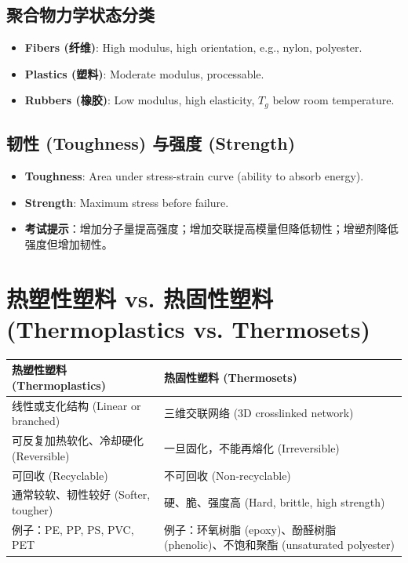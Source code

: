 \documentclass[12pt,a4paper]{ctexart}
\begin{document}
\subsection{聚合物力学状态分类}
\begin{itemize}
    \item \textbf{Fibers (纤维)}: High modulus, high orientation, e.g., nylon, polyester.
    \item \textbf{Plastics (塑料)}: Moderate modulus, processable.
    \item \textbf{Rubbers (橡胶)}: Low modulus, high elasticity, $T_g$ below room temperature.
\end{itemize}

\subsection{韧性 (Toughness) 与强度 (Strength)}
\begin{itemize}
    \item \textbf{Toughness}: Area under stress-strain curve (ability to absorb energy).
    \item \textbf{Strength}: Maximum stress before failure.
    \item \textbf{考试提示}：增加分子量提高强度；增加交联提高模量但降低韧性；增塑剂降低强度但增加韧性。
\end{itemize}

\section{热塑性塑料 vs. 热固性塑料 (Thermoplastics vs. Thermosets)}

\begin{longtable}{p{5cm}p{5cm}}
\toprule
\textbf{热塑性塑料 (Thermoplastics)} & \textbf{热固性塑料 (Thermosets)} \\
\midrule
线性或支化结构 (Linear or branched) & 三维交联网络 (3D crosslinked network) \\
可反复加热软化、冷却硬化 (Reversible) & 一旦固化，不能再熔化 (Irreversible) \\
可回收 (Recyclable) & 不可回收 (Non-recyclable) \\
通常较软、韧性较好 (Softer, tougher) & 硬、脆、强度高 (Hard, brittle, high strength) \\
例子：PE, PP, PS, PVC, PET & 例子：环氧树脂 (epoxy)、酚醛树脂 (phenolic)、不饱和聚酯 (unsaturated polyester) \\
\bottomrule
\end{longtable}
\end{document}
